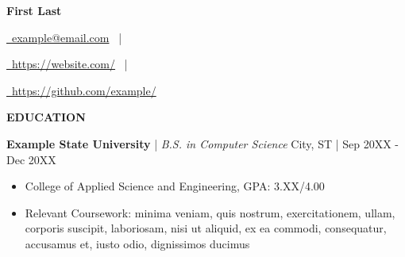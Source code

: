 \documentclass[letterpaper,9pt]{article}
\makeatletter
\newcommand{\organization}[4]{
    \vspace{1.5pt}

    \textbf{#1} | \emph{#3} \hfill{#4 | #2}

    \vspace{14pt}
}
\newcommand{\bulletsBegin}{
    \vspace{-8pt}
    \begin{minipage}{16.5cm} 
    \begin{itemize}[leftmargin=0.6cm]
    \setlength\itemsep{-0.05em}
}
\newcommand{\bulletsEnd}{
    \end{itemize}\vspace{0pt}
    \end{minipage}
}
\newcommand{\mySite}[1]{
    \href{https://example.com}{\faLink \ #1}
    \ |
}
\newcommand{\myEmail}[1]{
    \href{mailto:example@email.edu}{\faEnvelope \ #1}
    \ |
}
\newcommand{\myGitHub}[1]{
    \href{https://github.com/example/}{\faGithub \ #1}
}
\newcommand{\myName}[4]{
    \begin{center}
        {\huge{\textbf{{#1}}}} \\
        \vspace{7pt}
        \myEmail{#4}
        \mySite{#2}
        \myGitHub{#3}
    \end{center}
    \vspace{-10pt}
}
\newcommand{\resumeSection}[1]{
    \vspace{8pt}
    \hspace{15pt} \textbf{\color{bluee}#1}
    \vspace{2pt}
}
\makeatother
\begin{document}
    \myName{First Last}{https://website.com/}{https://github.com/example/}{example@email.com}
    
    \resumeSection{EDUCATION}
    \begin{siderules}[style=burgundyline]
        \vspace{-6pt}
        
        \organization{Example State University}{Sep 20XX - Dec 20XX}
        {B.S. in Computer Science }{City, ST}
        
        \bulletsBegin
        \item College of Applied Science and Engineering, GPA: 3.XX/4.00
        \item Relevant Coursework: minima veniam, quis nostrum, exercitationem, ullam, corporis suscipit, laboriosam, nisi ut aliquid, ex ea commodi, consequatur, accusamus et, iusto odio, dignissimos ducimus
        \bulletsEnd
        \vspace{-12pt}
    \end{siderules}
    
    
\end{document}
